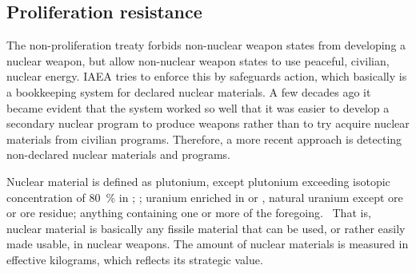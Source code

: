 
\subsection{Proliferation resistance}

The non-proliferation treaty forbids non-nuclear weapon states from developing a nuclear weapon, but allow non-nuclear weapon states to use peaceful, civilian, nuclear energy. IAEA tries to enforce this by safeguards action, which basically is a bookkeeping system for declared nuclear materials. A few decades ago it became evident that the system worked so well that it was easier to develop a secondary nuclear program to produce weapons rather than to try acquire nuclear materials from civilian programs. Therefore, a more recent approach is detecting non-declared nuclear materials and programs.

Nuclear material is defined as plutonium, except plutonium exceeding isotopic concentration of \SI{80}{\%} in ; ; uranium enriched in  or , natural uranium except ore or ore residue; anything containing one or more of the foregoing.~\cite{IAEA_glossary} That is, nuclear material is basically any fissile material that can be used, or rather easily made usable, in nuclear weapons. The amount of nuclear materials is measured in effective kilograms, which reflects its strategic value.

